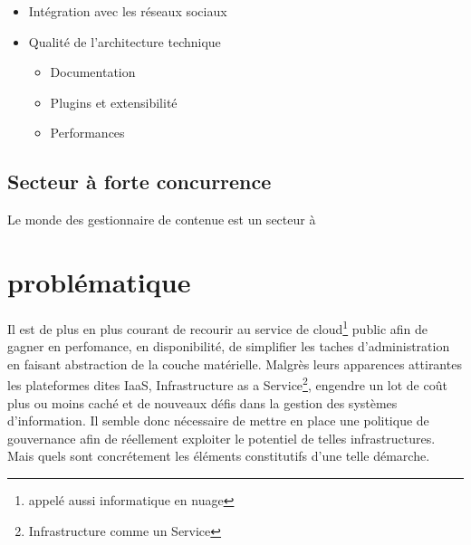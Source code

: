 \documentclass[11pt, a4paper ]{article}
\let\stdsection\section
\renewcommand\section{\newpage\stdsection}
\begin{document}
\begin{itemize}
	\item Intégration avec les réseaux sociaux

	\item Qualité de l'architecture technique
		\begin{itemize}
			\item Documentation

			\item Plugins et extensibilité

			\item Performances

		\end{itemize}

\end{itemize}

		\subsection{Secteur à forte concurrence}

Le monde des gestionnaire de contenue est un secteur à









		\section{problématique} %



Il est de plus en plus courant de recourir au service de cloud\footnote{appelé aussi informatique en nuage} public afin de gagner en perfomance, en disponibilité, de simplifier les taches d'administration en faisant abstraction de la couche matérielle.
Malgrès leurs apparences attirantes les plateformes dites IaaS, Infrastructure as a Service\footnote{Infrastructure comme un Service}, engendre un lot de coût plus ou moins caché et de nouveaux défis dans la gestion des systèmes d'information. Il semble donc nécessaire de mettre en place une politique de gouvernance afin de réellement exploiter le potentiel de telles infrastructures.
Mais quels sont concrétement les éléments constitutifs d'une telle démarche.
\end{document}
